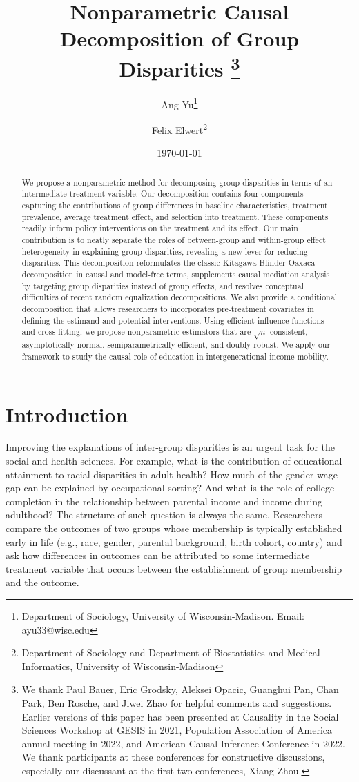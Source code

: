 \documentclass[12pt,a4paper]{article}
\title{\Large Nonparametric Causal Decomposition of Group Disparities \thanks{We thank Paul Bauer, Eric Grodsky, Aleksei Opacic, Guanghui Pan, Chan Park, Ben Rosche, and Jiwei Zhao for helpful comments and suggestions. Earlier versions of this paper has been presented at Causality in the Social Sciences Workshop at GESIS in 2021, Population Association of America annual meeting in 2022, and American Causal Inference Conference in 2022. We thank participants at these conferences for constructive discussions, especially our discussant at the first two conferences, Xiang Zhou.}}
\author{\large Ang Yu\thanks{Department of Sociology, University of Wisconsin-Madison. Email: ayu33@wisc.edu} \and Felix Elwert\thanks{Department of Sociology and Department of Biostatistics and Medical Informatics, University of Wisconsin-Madison}}
\date{\large \today}
\begin{document}
\maketitle

\begin{abstract}
We propose a nonparametric method for decomposing group disparities in terms of an intermediate treatment variable. Our decomposition contains four components capturing the contributions of group differences in baseline characteristics, treatment prevalence, average treatment effect, and selection into treatment. These components readily inform policy interventions on the treatment and its effect. Our main contribution is to neatly separate the roles of between-group and within-group effect heterogeneity in explaining group disparities, revealing a new lever for reducing disparities. This decomposition reformulates the classic Kitagawa-Blinder-Oaxaca decomposition in causal and model-free terms, supplements causal mediation analysis by targeting group disparities instead of group effects, and resolves conceptual difficulties of recent random equalization decompositions. We also provide a conditional decomposition that allows researchers to incorporates pre-treatment covariates in defining the estimand and potential interventions. Using efficient influence functions and cross-fitting, we propose nonparametric estimators that are $\sqrt{n}$-consistent, asymptotically normal, semiparametrically efficient, and doubly robust. We apply our framework to study the causal role of education in intergenerational income mobility. 
\end{abstract}

\section{Introduction}

Improving the explanations of inter-group disparities is an urgent task for the social and health sciences. For example, what is the contribution of educational attainment to racial disparities in adult health? How much of the gender wage gap can be explained by occupational sorting? And what is the role of college completion in the relationship between parental income and income during adulthood? 
The structure of such question is always the same. Researchers compare the outcomes of two groups whose membership is typically established early in life (e.g., race, gender, parental background, birth cohort, country) and ask how differences in outcomes can be attributed to some intermediate treatment variable that occurs between the establishment of group membership and the outcome. 
\end{document}
